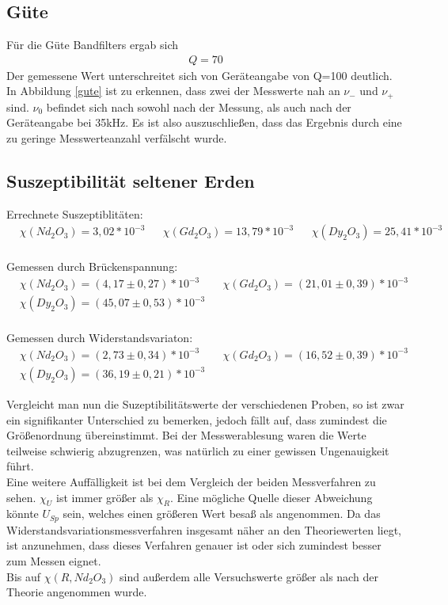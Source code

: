 \subsection{Güte}
Für die Güte Bandfilters ergab sich
\begin{align*}
Q=70
\end{align*}
Der gemessene Wert unterschreitet sich von Geräteangabe von Q=100 deutlich. In Abbildung \ref{gute} ist zu erkennen, dass zwei der Messwerte nah an $\nu_-$ und $\nu_+$ sind. $\nu_0$ befindet sich nach sowohl nach der Messung, als auch nach der Geräteangabe bei 35kHz. Es ist also auszuschließen, dass das Ergebnis durch eine zu geringe Messwerteanzahl verfälscht wurde.

\subsection{Suszeptibilität seltener Erden}
Errechnete Suszeptiblitäten:
\begin{align*}
&\chi(Nd_2O_3)=3,02*10^{-3}&&\chi(Gd_2O_3)=13,79*10^{-3}&&\chi(Dy_2O_3)=25,41*10^{-3}&
\end{align*}
\\
Gemessen durch Brückenspannung:
\begin{align*}
&\chi(Nd_2O_3)=(4,17\pm0,27)*10^{-3}&&\chi(Gd_2O_3)=(21,01\pm0,39)*10^{-3}&\\&\chi(Dy_2O_3)=(45,07\pm0,53)*10^{-3}&
\end{align*}
\\
Gemessen durch Widerstandsvariaton:
\begin{align*}
&\chi(Nd_2O_3)=(2,73\pm0,34)*10^{-3}&&\chi(Gd_2O_3)=(16,52\pm0,39)*10^{-3}&\\&\chi(Dy_2O_3)=(36,19\pm0,21)*10^{-3}&
\end{align*}

Vergleicht man nun die Suzeptibilitätswerte der verschiedenen Proben, so ist zwar ein signifikanter Unterschied
zu bemerken, jedoch fällt auf, dass zumindest die Größenordnung übereinstimmt. Bei der Messwerablesung waren die 
Werte teilweise schwierig abzugrenzen, was natürlich zu einer gewissen Ungenauigkeit führt. \\Eine weitere Auffälligkeit ist
bei dem Vergleich der beiden Messverfahren zu sehen. $\chi_U$ ist immer größer als $\chi_R$. Eine mögliche
Quelle dieser Abweichung könnte $U_{Sp}$ sein, welches einen größeren Wert besaß als angenommen. Da das 
Widerstandsvariationsmessverfahren insgesamt näher an den Theoriewerten liegt, ist anzunehmen, dass dieses
Verfahren genauer ist oder sich zumindest besser zum Messen eignet. \\Bis auf
$\chi(R,Nd_2O_3)$ sind außerdem alle Versuchswerte größer als nach der Theorie angenommen wurde.